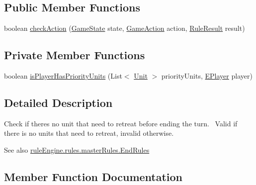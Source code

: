 \subsection*{Public Member Functions}
\begin{DoxyCompactItemize}
\item 
boolean \mbox{\hyperlink{classrule_engine_1_1rules_1_1atomic_rules_1_1_check_no_priority_unit_ally_a03dc1a2792b2e7bcbfa789d328566565}{check\+Action}} (\mbox{\hyperlink{classgame_1_1game_state_1_1_game_state}{Game\+State}} state, \mbox{\hyperlink{classrule_engine_1_1_game_action}{Game\+Action}} action, \mbox{\hyperlink{classrule_engine_1_1_rule_result}{Rule\+Result}} result)
\end{DoxyCompactItemize}
\subsection*{Private Member Functions}
\begin{DoxyCompactItemize}
\item 
boolean \mbox{\hyperlink{classrule_engine_1_1rules_1_1atomic_rules_1_1_check_no_priority_unit_ally_a45452c6d7649a9fdeef92f68eec43726}{is\+Player\+Has\+Priority\+Units}} (List$<$ \mbox{\hyperlink{classgame_1_1board_1_1_unit}{Unit}} $>$ priority\+Units, \mbox{\hyperlink{enumgame_1_1_e_player}{E\+Player}} player)
\end{DoxyCompactItemize}


\subsection{Detailed Description}
Check if there\textquotesingle{}s no unit that need to retreat before ending the turn.~\newline
 Valid if there is no units that need to retreat, invalid otherwise.

\begin{DoxySeeAlso}{See also}
\mbox{\hyperlink{classrule_engine_1_1rules_1_1master_rules_1_1_end_rules}{rule\+Engine.\+rules.\+master\+Rules.\+End\+Rules}} 
\end{DoxySeeAlso}


\subsection{Member Function Documentation}
\mbox{\label{classrule_engine_1_1rules_1_1atomic_rules_1_1_check_no_priority_unit_ally_a03dc1a2792b2e7bcbfa789d328566565}} 
